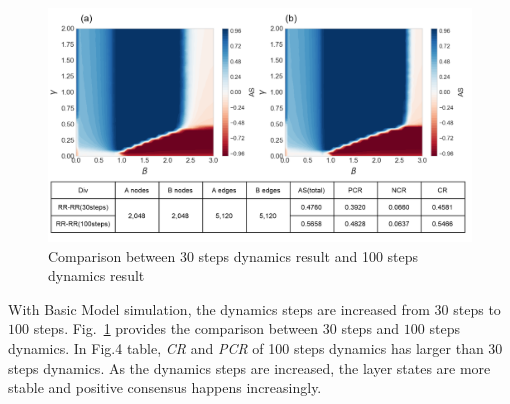 \documentclass[english]{cccconf}
\begin{document}
\begin{figure}[!htb]
  \centering
  \includegraphics[width=\hsize]{FIG4.png}
  \caption{Comparison between 30 steps dynamics result and 100 steps dynamics result}
  \label{Fig4}
\end{figure}
With Basic Model simulation, the dynamics steps are increased from $30$ steps to $100$ steps. Fig.~\ref{Fig4} provides the comparison between $30$ steps and $100$ steps dynamics. In Fig.4 table, \textit{CR} and \textit{PCR} of 100 steps dynamics  has larger than $30$ steps dynamics. As the dynamics steps are increased, the layer states are more stable and positive consensus happens increasingly. 
\end{document}
